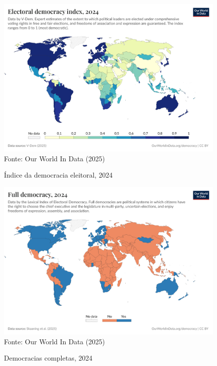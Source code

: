 \begin{figure}[ht]
    \centering
    \caption{Índice da democracia eleitoral, 2024}
    \includegraphics[width=1\linewidth]{figuras/democracia/electoral-democracy-index.png}
    \label{fig:electoral-democracy-index}
    \footnotesize{Fonte: Our World In Data (2025)}
\end{figure}

\begin{figure}[ht]
    \centering
    \caption{Democracias completas, 2024}
    \includegraphics[width=1\linewidth]{figuras/democracia/full-democracy-lexical.png}
    \label{fig:full-democracy-lexical}
    \footnotesize{Fonte: Our World In Data (2025)}
\end{figure}

